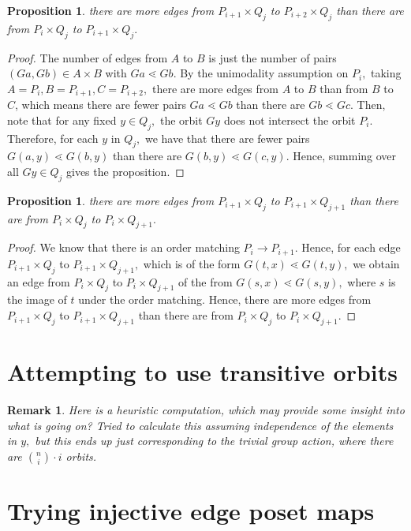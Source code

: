 \documentclass{amsart}
\newtheorem{prop}[subsubsection]{Proposition}
\newtheorem{rem}[subsubsection]{Remark}
\begin{document}
\begin{prop}
there are more edges from $P_{i+1} \times Q_j$ to $P_{i+2} \times Q_j$ than there are from $P_i \times Q_j$ to $P_{i+1} \times Q_j.$
\end{prop}
\begin{proof}
The number of edges from $A$ to $B$ is just the number of pairs $(Ga,Gb) \in A \times B$ with $Ga \lessdot Gb.$ By the unimodality assumption on $P_i,$ taking $A = P_i,B= P_{i+1},C = P_{i+2},$ there are more edges from $A$ to $B$ than from $B$ to $C$, which means there are fewer pairs $Ga \lessdot Gb$ than there are $Gb \lessdot Gc$. Then, note that for any fixed $y \in Q_j,$ the orbit $Gy$ does not intersect the orbit $P_i.$ Therefore, for each $y$ in $Q_j,$ we have that there are fewer pairs $G(a,y) \lessdot G(b,y)$ than there are $G(b,y)\lessdot G(c,y).$ Hence, summing over all $Gy \in Q_j$ gives the proposition.
\end{proof}
\begin{prop}
there are more edges from $P_{i+1} \times Q_j$ to $P_{i+1} \times Q_{j+1}$ than there are from $P_i \times Q_j$ to $P_{i} \times Q_{j+1}.$
\end{prop}
\begin{proof}
We know that there is an order matching $P_i \rightarrow P_{i+1}.$ Hence, for each edge $P_{i+1} \times Q_j$ to $P_{i+1} \times Q_{j+1},$ which is of the form $G(t,x) \lessdot G(t,y),$ we obtain an edge from $P_i \times Q_j$ to $P_{i} \times Q_{j+1}$ of the from  $G(s,x) \lessdot G(s,y),$ where $s$ is the image of $t$ under the order matching. Hence, there are more edges  from $P_{i+1} \times Q_j$ to $P_{i+1} \times Q_{j+1}$ than there are from $P_i \times Q_j$ to $P_{i} \times Q_{j+1}.$
\end{proof}

\section{Attempting to use transitive orbits}

\begin{rem}
Here is a heuristic computation, which may provide some insight into what is going on? Tried to calculate this assuming independence of the elements in $y,$ but this ends up just corresponding to the trivial group action, where there are $\binom n i \cdot i$ orbits.
\end{rem}

\section{Trying injective edge poset maps}
\end{document}
